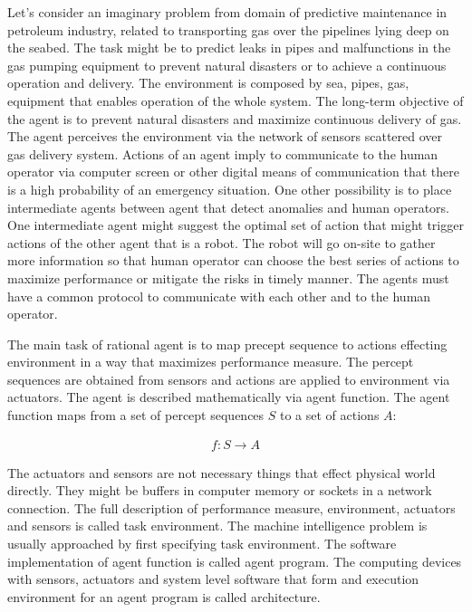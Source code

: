 \documentclass[english, 12pt, a4paper, elec, utf8, online]{aaltothesis}
\begin{document}
Let's consider an imaginary problem from domain of predictive maintenance in petroleum industry, related to transporting gas over the pipelines lying deep on the seabed. The task might be to predict leaks in pipes and malfunctions in the gas pumping equipment to prevent natural disasters or to achieve a continuous operation and delivery. The environment is composed by sea, pipes, gas, equipment that enables operation of the whole system. The long-term objective of the agent is to prevent natural disasters and maximize continuous delivery of gas. The agent perceives the environment via the network of sensors scattered over gas delivery system. Actions of an agent imply to communicate to the human operator via computer screen or other digital means of communication that there is a high probability of an emergency situation. One other possibility is to place intermediate agents between agent that detect anomalies and human operators. One intermediate agent might suggest the optimal set of action that might trigger actions of the other agent that is a robot. The robot will go on-site to gather more information so that human operator can choose the best series of actions to maximize performance or mitigate the risks in timely manner. The agents must have a common protocol to communicate with each other and to the human operator.

The main task of rational agent is to map precept sequence to actions effecting environment in a way that maximizes performance measure. The percept sequences are obtained from sensors and actions are applied to environment via actuators. The agent is described mathematically via agent function. The agent function maps from a set of percept sequences $S$ to a set of actions $A$:

\begin{align*}
f:S \rightarrow A
\end{align*}

The actuators and sensors are not necessary things that effect physical world directly. They might be buffers in computer memory or sockets in a network connection. The full description of performance measure, environment, actuators and sensors is called task environment. The machine intelligence problem is usually approached by first specifying task environment. The software implementation of agent function is called agent program. The computing devices with sensors, actuators and system level software that form and execution environment for an agent program is called architecture.~\cite{AIMA}   
\end{document}
